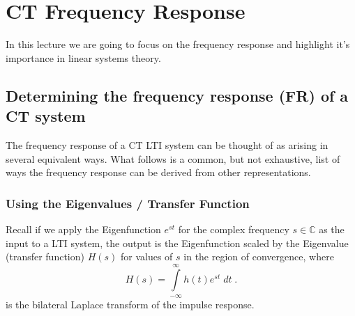 \section{CT Frequency Response}

In this lecture we are going to focus on the frequency response and highlight it's importance in linear systems theory.

\subsection{Determining the frequency response (FR) of a CT system}

The frequency response of a CT LTI system can be thought of as arising in several equivalent ways. What follows is a common, but not exhaustive, list of ways the frequency response can be derived from other representations.

\subsubsection*{Using the Eigenvalues / Transfer Function}

Recall if we apply the Eigenfunction $e^{st}$ for the complex frequency $s \in \mathbb{C}$ as the input to a LTI system, the output is the Eigenfunction scaled by the Eigenvalue (transfer function) $H(s)$ for values of $s$ in the region of convergence, where
\[
H(s) = \int\limits_{-\infty}^{\infty} h(t) e^{st}\; dt \; .
\]
is the bilateral Laplace transform of the impulse response.

